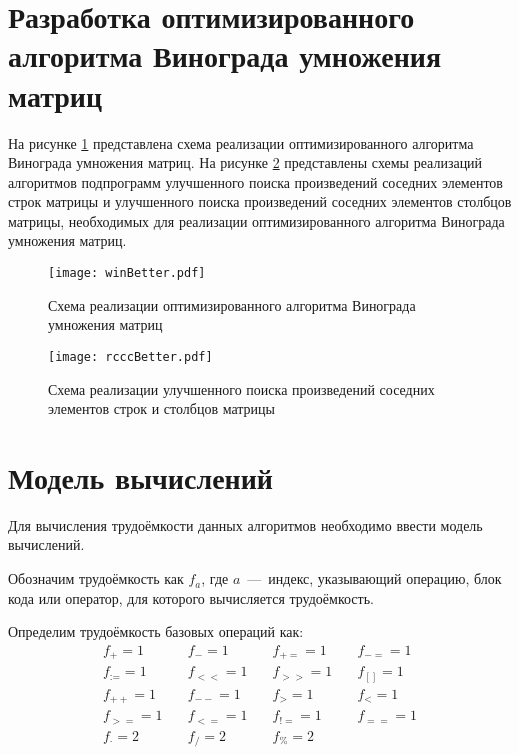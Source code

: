 \newpage

\section{Разработка оптимизированного алгоритма Винограда умножения матриц}
На рисунке \ref{img:winBetter} представлена схема реализации оптимизированного алгоритма Винограда умножения матриц. На рисунке \ref{img:rcccBetter} представлены схемы реализаций алгоритмов подпрограмм улучшенного поиска произведений соседних элементов строк матрицы и улучшенного поиска произведений соседних элементов столбцов матрицы, необходимых для реализации оптимизированного алгоритма Винограда умножения матриц.

\begin{figure}[h!]
    \centering
    \texttt{[image: winBetter.pdf]}
    \caption{Схема реализации оптимизированного алгоритма Винограда умножения матриц}
    \label{img:winBetter}
\end{figure}

\begin{figure}[h!]
    \centering
    \texttt{[image: rcccBetter.pdf]}
    \caption{Схема реализации улучшенного поиска произведений соседних элементов строк и столбцов матрицы}
    \label{img:rcccBetter}
\end{figure}

\newpage

\section{Модель вычислений}
Для вычисления трудоёмкости данных алгоритмов необходимо ввести модель вычислений.

Обозначим трудоёмкость как $f_{a}$, где $a$~---~индекс, указывающий операцию, блок кода или оператор, для которого вычисляется трудоёмкость.

Определим трудоёмкость базовых операций как:
\begin{equation}
\begin{array}{rrrr}
	f_{+}=1 & \quad f_{-}=1 & \quad f_{+=}=1 & \quad f_{-=}=1 \\
	f_{:=}=1 & \quad f_{<<}=1 & \quad f_{>>}=1 & \quad f_{[]}=1 \\
	f_{++}=1 & \quad f_{--}=1 & \quad f_{>}=1 & \quad f_{<}=1 \\
	f_{>=}=1 & \quad f_{<=}=1 & \quad f_{!=}=1 & \quad f_{==}=1 \\
	f_{\cdot}=2 & \quad f_{/}=2 & \quad f_{\%}=2 & \quad \\
\end{array}
\end{equation}

